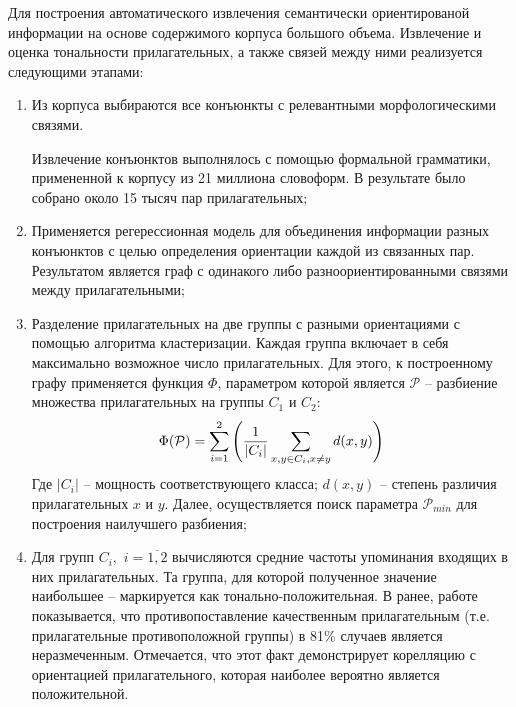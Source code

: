         Для построения автоматического извлечения семантически ориентированой
        информации на основе содержимого корпуса большого объема.
        Извлечение и оценка тональности прилагательных, а также связей между ними
        реализуется следующими этапами:
        \begin{enumerate}
            \item Из корпуса выбираются все конъюнкты с релевантными
                морфологическими связями.

                Извлечение конъюнктов выполнялось с помощью формальной
                грамматики, примененной к корпусу из 21 миллиона словоформ.
                В результате было собрано около 15 тысяч пар прилагательных;

            \item Применяется регерессионная модель для объединения информации
                разных конъюнктов с целью определения ориентации каждой из связанных пар.
                Результатом является граф с одинакого либо разноориентированными
                связями между прилагательными;
            \item Разделение прилагательных на две группы с разными ориентациями
                с помощью алгоритма кластеризации. Каждая группа включает в себя
                максимально возможное число прилагательных.
                Для этого, к построенному графу применяется функция $\Phi$,
                параметром которой является $\mathcal{P}$ -- разбиение множества
                прилагательных на группы $C_1$ и $C_2$:
                \begin{equation}
                    \Phi(\mathcal{P}) = \sum\limits_{i=1}^2 \Bigg( \dfrac{1}{|C_i|} \sum\limits_{x,y \in C_i, \\ x \neq y} d(x,y) \Bigg)
                \end{equation}
                Где $|C_i|$ -- мощность соответствующего класса; $d(x, y)$ --
                степень различия прилагательных $x$ и $y$.
                Далее, осуществляется поиск параметра $\mathcal{P}_{min}$ для
                построения наилучшего разбиения;

            \item Для групп $C_i, \hspace{4pt} i=\overline{1,2}$ вычисляются
                средние частоты упоминания входящих в них прилагательных.
                Та группа, для которой полученное значение наибольшее --
                маркируется как тонально-положительная.
                В ранее, работе \cite{lexiconAdjectivesPrevious} показывается,
                что противопоставление качественным прилагательным (т.е.
                прилагательные противоположной группы) в 81\% случаев является
                неразмеченным. Отмечается, что этот факт демонстрирует корелляцию
                с ориентацией прилагательного, которая наиболее вероятно является
                положительной.
        \end{enumerate}

